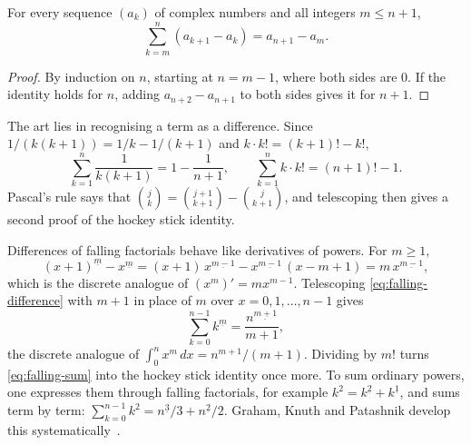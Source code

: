 \begin{proposition}[Telescoping]
\label{prop:telescoping}
For every sequence $(a_k)$ of complex numbers and all integers $m\le n+1$,
\[
\sum_{k=m}^{n}(a_{k+1}-a_k)=a_{n+1}-a_m .
\]
\end{proposition}

\begin{proof}
By induction on $n$, starting at $n=m-1$, where both sides are $0$. If the identity holds for $n$, adding $a_{n+2}-a_{n+1}$ to both sides gives it for $n+1$.
\end{proof}

The art lies in recognising a term as a difference. Since $1/(k(k+1))=1/k-1/(k+1)$ and $k\cdot k!=(k+1)!-k!$,
\[
\sum_{k=1}^{n}\frac1{k(k+1)}=1-\frac1{n+1},\qquad\sum_{k=1}^{n}k\cdot k!=(n+1)!-1 .
\]
Pascal's rule says that $\binom{j}{k}=\binom{j+1}{k+1}-\binom{j}{k+1}$, and telescoping then gives a second proof of the hockey stick identity.

Differences of falling factorials behave like derivatives of powers. For $m\ge1$,
\begin{equation}
(x+1)^{\underline m}-x^{\underline m}=(x+1)\,x^{\underline{m-1}}-x^{\underline{m-1}}\,(x-m+1)=m\,x^{\underline{m-1}},
\label{eq:falling-difference}
\end{equation}
which is the discrete analogue of $(x^m)'=mx^{m-1}$. Telescoping \eqref{eq:falling-difference} with $m+1$ in place of $m$ over $x=0,1,\ldots,n-1$ gives
\begin{equation}
\sum_{k=0}^{n-1}k^{\underline m}=\frac{n^{\underline{m+1}}}{m+1},
\label{eq:falling-sum}
\end{equation}
the discrete analogue of $\int_0^nx^m\,dx=n^{m+1}/(m+1)$. Dividing by $m!$ turns \eqref{eq:falling-sum} into the hockey stick identity once more. To sum ordinary powers, one expresses them through falling factorials, for example $k^2=k^{\underline2}+k^{\underline1}$, and sums term by term: $\sum_{k=0}^{n-1}k^2=n^{\underline3}/3+n^{\underline2}/2$. Graham, Knuth and Patashnik develop this  systematically~\cite[Sect.~2.6]{graham1994concrete}.

